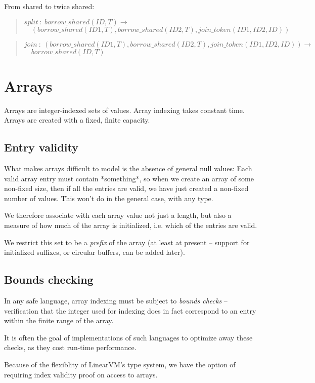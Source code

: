 \documentclass[a4paper]{book}
\newcommand\FuncSignatureII[3]{\begin{quote}$\mathit{#1}\ :\ \mathit{#2} \to$\\${}\quad \mathit{#3}$ \end{quote}}
\begin{document}
\noindent
From shared to twice shared:

\FuncSignatureII{split}
{borrow\_shared(ID, T)}
{(borrow\_shared(ID1, T), borrow\_shared(ID2, T), join\_token(ID1,ID2,ID))}

\FuncSignatureII{join}
{(borrow\_shared(ID1, T), borrow\_shared(ID2, T), join\_token(ID1,ID2,ID))}
{borrow\_shared(ID, T)}



\chapter{Arrays}

Arrays are integer-indexed sets of values.
Array indexing takes constant time.
Arrays are created with a fixed, finite capacity.

\section{Entry validity}

What makes arrays difficult to model is the absence of general null values:
Each valid array entry must contain *something*, so when we create an
array of some non-fixed size, then if all the entries are valid, we
have just created a non-fixed number of values.
This won't do in the general case, with any type.

We therefore associate with each array value not just a length, but
also a measure of how much of the array is initialized, i.e. which of
the entries are valid.

We restrict this set to be a \emph{prefix} of the array (at least at
present -- support for initialized suffixes, or circular buffers, can
be added later).

\section{Bounds checking}
In any safe language, array indexing must be subject to \emph{bounds checks}
-- verification that the integer used for indexing does in fact correspond to
an entry within the finite range of the array.

It is often the goal of implementations of such languages to optimize
away these checks, as they cost run-time performance.

Because of the flexiblity of LinearVM's type system, we have the option
of requiring index validity proof on access to arrays.
\end{document}
